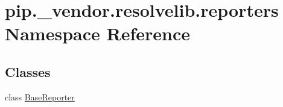 \hypertarget{namespacepip_1_1__vendor_1_1resolvelib_1_1reporters}{}\section{pip.\+\_\+vendor.\+resolvelib.\+reporters Namespace Reference}
\label{namespacepip_1_1__vendor_1_1resolvelib_1_1reporters}
\subsection*{Classes}
\begin{DoxyCompactItemize}
\item 
class \hyperlink{classpip_1_1__vendor_1_1resolvelib_1_1reporters_1_1BaseReporter}{Base\+Reporter}
\end{DoxyCompactItemize}
